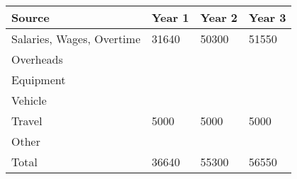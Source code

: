 \documentclass[version=last,
    paper=a4, %
    10pt, %
    usenames,
    dvipsnames,
    oneside, %
    headings=openany, %
    DIV=15 %
]{scrbook}
\begin{document}
\begin{longtabu} to \linewidth { |  X | X | X | X | }
\hline
{}
Source & Year 1 & Year 2 & Year 3\\
\hline
\endhead



Salaries, Wages, Overtime & 31640 & 50300 & 51550\\



Overheads &  &  & \\



Equipment &  &  & \\



Vehicle &  &  & \\



Travel & 5000 & 5000 & 5000\\



Other &  &  & \\



Total & 36640 & 55300 & 56550\\


\hline
\end{longtabu}





\end{document}
